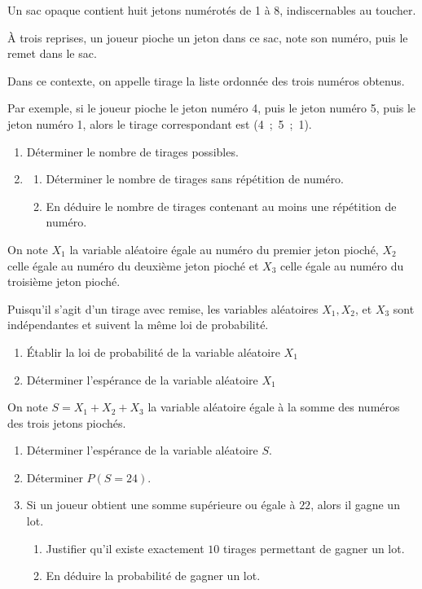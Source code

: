 \medskip

Un sac opaque contient huit jetons numérotés de 1 à 8, indiscernables au toucher.

À trois reprises, un joueur pioche un jeton dans ce sac, note son numéro, puis le remet dans le sac.

Dans ce contexte, on appelle \og tirage \fg{} la liste ordonnée des trois numéros obtenus.

Par exemple, si le joueur pioche le jeton numéro 4, puis le jeton numéro 5, puis le jeton numéro 1, alors le tirage correspondant est (4~;~5~;~1).

\medskip

\begin{enumerate}
\item Déterminer le nombre de tirages possibles.
\item 
	\begin{enumerate}
		\item Déterminer le nombre de tirages sans répétition de numéro.
		\item En déduire le nombre de tirages contenant au moins une répétition de numéro.
	\end{enumerate}
\end{enumerate}
	
On note $X_1$ la variable aléatoire égale au numéro du premier jeton pioché, $X_2$ celle égale au numéro du deuxième jeton pioché et $X_3$ celle égale au numéro du troisième jeton pioché.

Puisqu'il s'agit d'un tirage avec remise, les variables aléatoires $X_1, X_2$, et $X_3$ sont indépendantes et suivent la même loi de probabilité.

\begin{enumerate}[resume]
\item Établir la loi de probabilité de la variable aléatoire $X_1$
\item Déterminer l'espérance de la variable aléatoire $X_1$
\end{enumerate}

On note $S = X_1 + X_2 + X_3$ la variable aléatoire égale à la somme des numéros des trois jetons piochés.

\begin{enumerate}[resume]
\item Déterminer l'espérance de la variable aléatoire $S$.
\item Déterminer $P(S = 24)$.
\item Si un joueur obtient une somme supérieure ou égale à $22$, alors il gagne un lot.
	\begin{enumerate}
		\item Justifier qu'il existe exactement $10$ tirages permettant de gagner un lot.
		\item En déduire la probabilité de gagner un lot.
	\end{enumerate}
\end{enumerate}

\medskip

